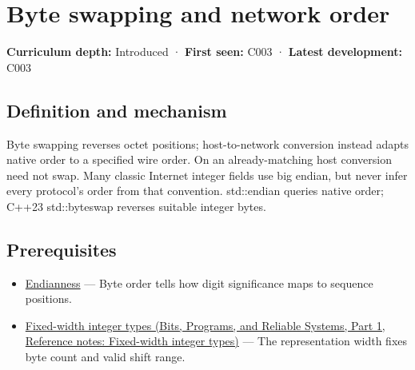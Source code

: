 \hypertarget{appendix-11ba36693aa2}{}\label{referencestart:appendix-11ba36693aa2}
\section{Byte swapping and network order}\label{appendix-11ba36693aa2-byte-swapping-and-network-order}

\hypertarget{appendix-11ba36693aa2-byte-swapping-and-network-order}{}

\textbf{Curriculum depth:} Introduced · \textbf{First seen:} C003 · \textbf{Latest development:} C003

\begin{allmightroledefinition}

\subsection{Definition and mechanism}\label{appendix-11ba36693aa2-definition-and-mechanism}

\hypertarget{appendix-11ba36693aa2-definition-and-mechanism}{}

Byte swapping reverses octet positions; host-to-network conversion instead adapts native order to a specified wire order. On an already-matching host conversion need not swap. Many classic Internet integer fields use big endian, but never infer every protocol's order from that convention. std::endian queries native order; C++23 std::byteswap reverses suitable integer bytes.

\end{allmightroledefinition}

\subsection{Prerequisites}\label{appendix-11ba36693aa2-prerequisites}

\hypertarget{appendix-11ba36693aa2-prerequisites}{}

\begin{itemize}
\tightlist
\item
  \hyperref[appendix-bc07c3d25b18]{Endianness} --- Byte order tells how digit significance maps to sequence positions.
\item
  \href{../01-Bits-Programs-and-Reliable-Systems-P01/main.pdf\#nameddest=appendix-cc04044b5782}{Fixed-width integer types (Bits, Programs, and Reliable Systems, Part 1, Reference notes: Fixed-width integer types)} --- The representation width fixes byte count and valid shift range.
\end{itemize}

